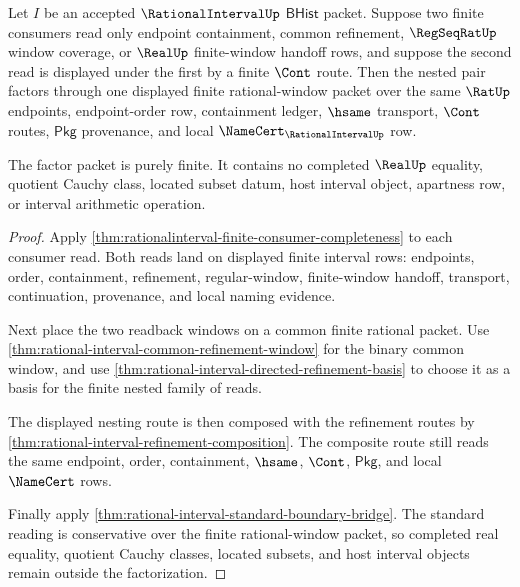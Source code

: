 \begin{theorem}
\label{thm:rationalinterval-nested-consumer-window-factorization}
Let $I$ be an accepted $\RationalIntervalUp$ $\mathsf{BHist}$ packet. Suppose
two finite consumers read only endpoint containment, common refinement,
$\RegSeqRatUp$ window coverage, or $\RealUp$ finite-window handoff rows, and
suppose the second read is displayed under the first by a finite $\Cont$ route.
Then the nested pair factors through one displayed finite rational-window
packet over the same $\RatUp$ endpoints, endpoint-order row, containment
ledger, $\hsame$ transport, $\Cont$ routes, $\mathsf{Pkg}$ provenance, and
local $\NameCert_{\RationalIntervalUp}$ row.

The factor packet is purely finite. It contains no completed $\RealUp$
equality, quotient Cauchy class, located subset datum, host interval object,
apartness row, or interval arithmetic operation.
\end{theorem}
\begin{proof}
Apply \autoref{thm:rationalinterval-finite-consumer-completeness} to each
consumer read. Both reads land on displayed finite interval rows: endpoints,
order, containment, refinement, regular-window, finite-window handoff,
transport, continuation, provenance, and local naming evidence.

Next place the two readback windows on a common finite rational packet. Use
\autoref{thm:rational-interval-common-refinement-window} for the binary common
window, and use \autoref{thm:rational-interval-directed-refinement-basis} to
choose it as a basis for the finite nested family of reads.

The displayed nesting route is then composed with the refinement routes by
\autoref{thm:rational-interval-refinement-composition}. The composite route
still reads the same endpoint, order, containment, $\hsame$, $\Cont$,
$\mathsf{Pkg}$, and local $\NameCert$ rows.

Finally apply \autoref{thm:rational-interval-standard-boundary-bridge}. The
standard reading is conservative over the finite rational-window packet, so
completed real equality, quotient Cauchy classes, located subsets, and host
interval objects remain outside the factorization.
\end{proof}

